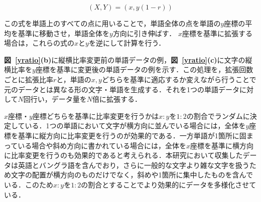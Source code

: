 \begin{equation}
  (X, Y) = (x, y(1-r))
  \label{eq:yratio<}
\end{equation}

この式を単語上のすべての点に用いることで，単語全体の点を単語の$y$座標の平均を基準に移動させ，単語全体を$y$方向に引き伸ばす．
$x$座標を基準に拡張する場合は，これらの式の$x$と$y$を逆にして計算を行う．


\textbf{図~\ref{yratio}(b)}に縦横比率変更前の単語データの例，\textbf{図~\ref{yratio}(c)}に文字の縦横比率を$y$座標を基準に変更後の単語データの例を示す．この処理を，拡張回数ごとに拡張比率$r$と，単語の$x,y$どちらを基準に適応するか変えながら行うことで元のデータとは異なる形の文字・単語を生成する．それを1つの単語データに対して$N$回行い，データ量を$N$倍に拡張する．

$x$座標・$y$座標どちらを基準に比率変更を行うかは$x:y$を$1:2$の割合でランダムに決定している．1つの単語において文字が横方向に並んでいる場合には，全体を$y$座標を基準に縦方向に比率変更を行うのが効果的である．一方単語が1箇所に固まっている場合や斜め方向に書かれている場合には，全体を$x$座標を基準に横方向に比率変更を行うのも効果的であると考えられる．本研究において収集したデータは英語とバングラ語を含んでおり，さらに一般的な文字より雑な文字を扱うため文字の配置が横方向のものだけでなく，斜めや1箇所に集中したものを含んでいる．このため$x:y$を$1:2$の割合とすることでより効果的にデータを多様化させている．

